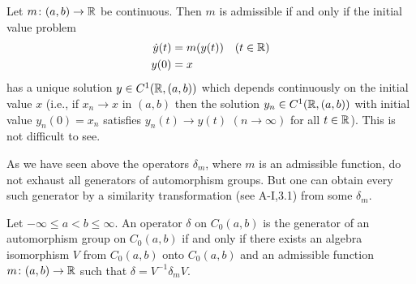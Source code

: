 \begin{remark*}\label{rem:b2-3.24}
%
Let $m \colon (a,b) \to \mathbb{R}$ be continuous.
Then $m$ is admissible if and only if the initial value problem
\begin{align*}
\dot{y}(t) &= m(y(t)) \quad (t \in \mathbb{R}) \\
y(0) &= x
\end{align*}
has a unique solution $y \in C^{1}(\mathbb{R},(a,b))$ which depends continuously on the initial value $x$ (i.e., if $x_{n} \to x$ in $(a,b)$ then the solution $y_{n} \in C^{1}(\mathbb{R},(a,b))$ with initial value $y_{n}(0) = x_{n}$ satisfies $y_{n}(t) \to y(t)$ $(n \to \infty)$ for all $t \in \mathbb{R}$).
This is not difficult to see.
\end{remark*}
As we have seen above the operators $\delta_{m}$, where $m$ is an admissible function, do not exhaust all generators of automorphism groups.
But one can obtain every such generator by a similarity transformation (see A-I,3.1) from some $\delta_{m}$.
\begin{theorem}\label{thm:b2-3.24}
%
Let $-\infty \leq a < b \leq \infty$.
An operator $\delta$ on $C_{0}(a,b)$ is the generator of an automorphism group on $C_{0}(a,b)$ if and only if there exists an algebra isomorphism $V$ from $C_{0}(a,b)$ onto $C_{0}(a,b)$ and an admissible function $m \colon (a,b) \to \mathbb{R}$ such that $\delta = V^{-1}\delta_{m}V$.
\end{theorem}
